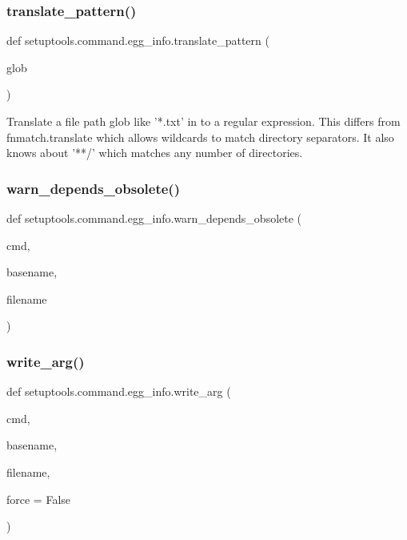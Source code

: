 \subsubsection{\texorpdfstring{translate\+\_\+pattern()}{translate\_pattern()}}
{\footnotesize\ttfamily def setuptools.\+command.\+egg\+\_\+info.\+translate\+\_\+pattern (\begin{DoxyParamCaption}\item[{}]{glob }\end{DoxyParamCaption})}

\begin{DoxyVerb}Translate a file path glob like '*.txt' in to a regular expression.
This differs from fnmatch.translate which allows wildcards to match
directory separators. It also knows about '**/' which matches any number of
directories.
\end{DoxyVerb}
 \mbox{\label{namespacesetuptools_1_1command_1_1egg__info_a8328fab813b7049a7850641b991f06f4}} 
\subsubsection{\texorpdfstring{warn\+\_\+depends\+\_\+obsolete()}{warn\_depends\_obsolete()}}
{\footnotesize\ttfamily def setuptools.\+command.\+egg\+\_\+info.\+warn\+\_\+depends\+\_\+obsolete (\begin{DoxyParamCaption}\item[{}]{cmd,  }\item[{}]{basename,  }\item[{}]{filename }\end{DoxyParamCaption})}

\mbox{\label{namespacesetuptools_1_1command_1_1egg__info_a25f4fcbcc6aaa9f956521ad1aa5c66a3}} 
\subsubsection{\texorpdfstring{write\+\_\+arg()}{write\_arg()}}
{\footnotesize\ttfamily def setuptools.\+command.\+egg\+\_\+info.\+write\+\_\+arg (\begin{DoxyParamCaption}\item[{}]{cmd,  }\item[{}]{basename,  }\item[{}]{filename,  }\item[{}]{force = {\ttfamily False} }\end{DoxyParamCaption})}

